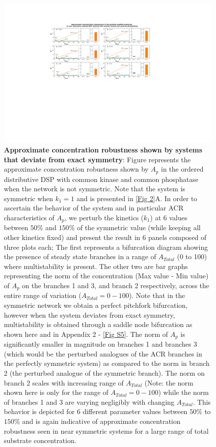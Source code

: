 \documentclass[9pt,lineno]{elife}
\begin{document}
\clearpage
\begin{figure}
    \centering
    \includegraphics[width=\linewidth, height = 0.75\paperheight, keepaspectratio]{FigS06.pdf}
    \caption{\textbf{Approximate concentration robustness shown by systems that deviate from exact symmetry}: Figure represents the approximate concentration robustness shown by $A_p$ in the ordered distributive DSP with common kinase and common phosphatase when the network is not symmetric.
    Note that the system is symmetric when $k_1=1$ and is presented in \cref{Fig 2}A. 
    In order to ascertain the behavior of the system and in particular ACR characteristics of $A_p$, we perturb the kinetics ($k_1$) at 6 values between $50\%$ and $150\%$ of the symmetric value (while keeping all other kinetics fixed) and present the result in 6 panels composed of three plots each; The first represents a bifurcation diagram showing the presence of steady state branches in a range of $A_{Total}$ (0 to 100) where multistability is present. 
    The other two are bar graphs representing the norm of the concentration (Max value - Min value) of $A_p$ on the branches 1 and 3, and branch 2 respectively, across the entire range of variation ($A_{Total}=0-100$). 
    Note that in the symmetric network we obtain a perfect pitchfork bifurcation, however when the system deviates from exact symmetry, multistability is obtained through a saddle node bifurcation as shown here and in Appendix 2 - \cref{Fig S5}. The norm of $A_p$ is significantly smaller in magnitude on branches 1 and branches 3 (which would be the perturbed analogues of the ACR branches in the perfectly symmetric system) as compared to the norm in branch 2 (the perturbed analogue of the symmetric branch). The norm on branch 2 scales with increasing range of $A_{Total}$ (Note: the norm shown here is only for the range of $A_{Total} = 0 - 100$) while the norm of branches 1 and 3 are varying negligibly with changing $A_{Total}$. This behavior is depicted for 6 different parameter values between $50\%$ to $150\%$ and is again indicative of approximate concentration robustness seen in near symmetric systems for a large range of total substrate concentration.}
    \label{Fig S6}
\end{figure}
\end{document}
